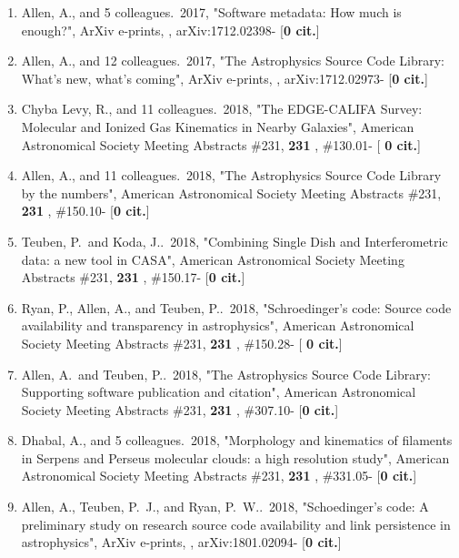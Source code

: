 \documentclass[11pt,letterpaper]{article}
\newcommand{\rsquo}{'}
\begin{document}
\begin{enumerate}[resume,label=\textbf{\arabic*}.]
\item  
Allen, A., and 5 colleagues.\  2017,  "Software metadata: How much is 
enough?", ArXiv e-prints,  , arXiv:1712.02398- [{\bf 0 cit.}] 

\item  
Allen, A., and 12 colleagues.\  2017,  "The Astrophysics Source Code 
Library: What's new, what's coming", ArXiv e-prints,  , arXiv:1712.02973- 
[{\bf 0 cit.}] 

\item  
Chyba Levy, R., and 11 colleagues.\  2018,  "The EDGE-CALIFA Survey: 
Molecular and Ionized Gas Kinematics in Nearby Galaxies", American 
Astronomical Society Meeting Abstracts \#231,  {\bf 231} , \#130.01- [{\bf 
0 cit.}] 

\item  
Allen, A., and 11 colleagues.\  2018,  "The Astrophysics Source Code 
Library by the numbers", American Astronomical Society Meeting Abstracts 
\#231,  {\bf 231} , \#150.10- [{\bf 0 cit.}] 

\item  
Teuben, P.~and Koda, J..\  2018,  "Combining Single Dish and 
Interferometric data: a new tool in CASA", American Astronomical Society 
Meeting Abstracts \#231,  {\bf 231} , \#150.17- [{\bf 0 cit.}] 

\item  
Ryan, P., Allen, A., and Teuben, P..\  2018,  "Schroedinger{\rsquo}s code: 
Source code availability and transparency in astrophysics", American 
Astronomical Society Meeting Abstracts \#231,  {\bf 231} , \#150.28- [{\bf 
0 cit.}] 

\item  
Allen, A.~and Teuben, P..\  2018,  "The Astrophysics Source Code Library: 
Supporting software publication and citation", American Astronomical 
Society Meeting Abstracts \#231,  {\bf 231} , \#307.10- [{\bf 0 cit.}] 

\item  
Dhabal, A., and 5 colleagues.\  2018,  "Morphology and kinematics of 
filaments in Serpens and Perseus molecular clouds: a high resolution 
study", American Astronomical Society Meeting Abstracts \#231,  {\bf 231} , 
\#331.05- [{\bf 0 cit.}] 

\item  
Allen, A., Teuben, P.~J., and Ryan, P.~W..\  2018,  "Schoedinger's code: A 
preliminary study on research source code availability and link persistence 
in astrophysics", ArXiv e-prints,  , arXiv:1801.02094- [{\bf 0 cit.}] 


\end{enumerate}
\end{document}
